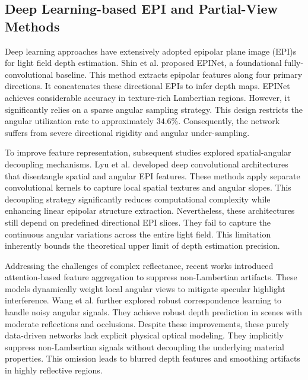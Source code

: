 \documentclass[lettersize,journal]{IEEEtran}
\begin{document}
\subsection{Deep Learning-based EPI and Partial-View Methods}

Deep learning approaches have extensively adopted epipolar plane image (EPI)s for light field depth estimation. Shin et al. \cite{heber2018} proposed EPINet, a foundational fully-convolutional baseline. This method extracts epipolar features along four primary directions. It concatenates these directional EPIs to infer depth maps. EPINet achieves considerable accuracy in texture-rich Lambertian regions. However, it significantly relies on a sparse angular sampling strategy. This design restricts the angular utilization rate to approximately $34.6\%$. Consequently, the network suffers from severe directional rigidity and angular under-sampling.

To improve feature representation, subsequent studies explored spatial-angular decoupling mechanisms. Lyu et al. \cite{lyu2022} developed deep convolutional architectures that disentangle spatial and angular EPI features. These methods apply separate convolutional kernels to capture local spatial textures and angular slopes. This decoupling strategy significantly reduces computational complexity while enhancing linear epipolar structure extraction. Nevertheless, these architectures still depend on predefined directional EPI slices. They fail to capture the continuous angular variations across the entire light field. This limitation inherently bounds the theoretical upper limit of depth estimation precision.

Addressing the challenges of complex reflectance, recent works \cite{li2021, zhang2023} introduced attention-based feature aggregation to suppress non-Lambertian artifacts. These models dynamically weight local angular views to mitigate specular highlight interference. Wang et al. \cite{wang2023} further explored robust correspondence learning to handle noisy angular signals. They achieve robust depth prediction in scenes with moderate reflections and occlusions. Despite these improvements, these purely data-driven networks lack explicit physical optical modeling. They implicitly suppress non-Lambertian signals without decoupling the underlying material properties. This omission leads to blurred depth features and smoothing artifacts in highly reflective regions.
\end{document}
